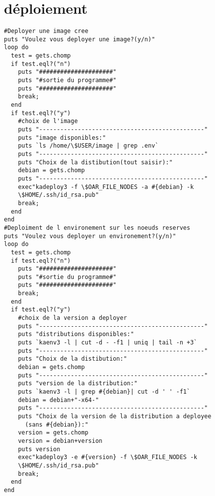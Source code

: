 \section{déploiement}
\begin{lstlisting}
#Deployer une image cree
puts "Voulez vous deployer une image?(y/n)"
loop do
  test = gets.chomp
  if test.eql?("n")
    puts "#####################"
    puts "#sortie du programme#"
    puts "#####################"
    break;
  end
  if test.eql?("y")
    #choix de l'image                                                                                                                 
    puts "-----------------------------------------------"
    puts "image disponibles:"
    puts `ls /home/\$USER/image | grep .env`
    puts "-----------------------------------------------"
    puts "Choix de la distibution(tout saisir):"
    debian = gets.chomp
    puts "-----------------------------------------------"
    exec"kadeploy3 -f \$OAR_FILE_NODES -a #{debian} -k 
	\$HOME/.ssh/id_rsa.pub"
    break;
  end
end
#Deploiment de l environement sur les noeuds reserves                          
puts "Voulez vous deployer un environement?(y/n)"
loop do
  test = gets.chomp
  if test.eql?("n")
    puts "#####################"
    puts "#sortie du programme#"
    puts "#####################"
    break;
  end
  if test.eql?("y")                                                            
    #choix de la version a deployer                                            
    puts "-----------------------------------------------"
    puts "distributions disponibles:"
    puts `kaenv3 -l | cut -d - -f1 | uniq | tail -n +3`
    puts "-----------------------------------------------"
    puts "Choix de la distibution:"
    debian = gets.chomp
    puts "-----------------------------------------------"
    puts "version de la distribution:"
    puts `kaenv3 -l | grep #{debian}| cut -d ' ' -f1`
    debian = debian+"-x64-"
    puts "-----------------------------------------------"
    puts "Choix de la version de la distribution a deployee 
	  (sans #{debian}):"
    version = gets.chomp
    version = debian+version
    puts version
    exec"kadeploy3 -e #{version} -f \$OAR_FILE_NODES -k 
	\$HOME/.ssh/id_rsa.pub"
    break;
  end
end
\end{lstlisting}
